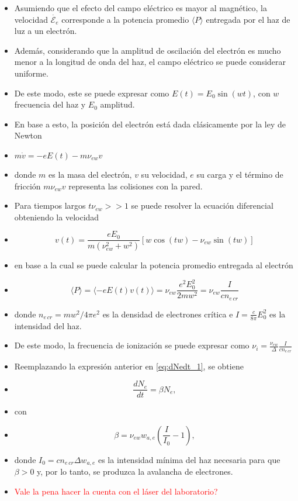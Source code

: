\documentclass[aps,prb,twocolumn,superscriptaddress,floatfix,longbibliography,10pt]{revtex4-2}
\newif\ifptitle
\newif\ifpnumber
\newcounter{para}
\newcommand\ptitle[1]{\par\refstepcounter{para}
{\ifpnumber{\noindent\textcolor{lightgray}{\textbf{\thepara}}\indent}\fi}
{\ifptitle{\textbf{[{#1}]}}\fi}}
\begin{document}
\ptitle{Determinación de la frecuencia de ionización}
\begin{itemize}
  \item Asumiendo que el efecto del campo eléctrico es mayor al magnético, la velocidad $\dot{\mathcal{E}_e}$ corresponde a la potencia promedio $\langle P \rangle$ entregada por el haz de luz a un electrón.
  \item Además, considerando que la amplitud de oscilación del electrón es mucho menor a la longitud de onda del haz, el campo eléctrico se puede considerar uniforme.
  \item De este modo, este se puede expresar como $E(t) = E_0 \sin{(w t)}$, con $w$ frecuencia del haz y $E_0$ amplitud.
  \item En base a esto, la posición del electrón está dada clásicamente por la ley de Newton
  \item $m \dot{v} = -e E(t) -m \nu_{e w} v $
  \item donde $m$ es la masa del electrón, $v$ su velocidad, $e$ su carga y el término de fricción $m \nu_{e w} v$ representa las colisiones con la pared.
  \item Para tiempos largos $t \nu_{e w} >> 1$ se puede resolver la ecuación diferencial obteniendo la velocidad
  \item \[v(t) = \frac{e E_0}{m(\nu_{e w}^2 + w^2)}[w \cos{(t w)} - \nu_{e w} \sin{(t w)}] \]
  \item en base a la cual se puede calcular la potencia promedio entregada al electrón
  \item \[\langle P \rangle = \langle - e E(t) v(t) \rangle = \nu_{e w}\frac{e^2 E_0^2}{2 m w^2} = \nu_{e w} \frac{I}{c n_{e \, cr}}\] 
  \item donde $n_{e \, cr} = mw^2/4 \pi e^2$ es la densidad de electrones crítica e $I = \frac{c}{8 \pi} E_0^2$ es la intensidad del haz.
  \item De este modo, la frecuencia de ionización se puede expresar como $\nu_i = \frac{\nu_{e w}}{\Delta} \frac{I}{c n_{e \, cr}}$
\end{itemize}

\ptitle{Determinación del nro de electrones en función del tiempo}
\begin{itemize}
  \item Reemplazando la expresión anterior en \ref{eq:dNedt_1}, se obtiene
  \item 
  \begin{equation}
    \frac{dN_e}{dt} = \beta N_e,
    \label{eq:dNedt_2}
  \end{equation}
  \item con
  \item \[ \beta = \nu_{e w} w_{a,e} \left ( \frac{I}{I_0} - 1 \right ), \]
  \item donde $I_0 = c n_{e \, cr} \Delta w_{a,e}$ es la intensidad mínima del haz necesaria para que $\beta>0$ y, por lo tanto, se produzca la avalancha de electrones.
  \item \textcolor{red}{Vale la pena hacer la cuenta con el láser del laboratorio?}
\end{itemize}
\end{document}
